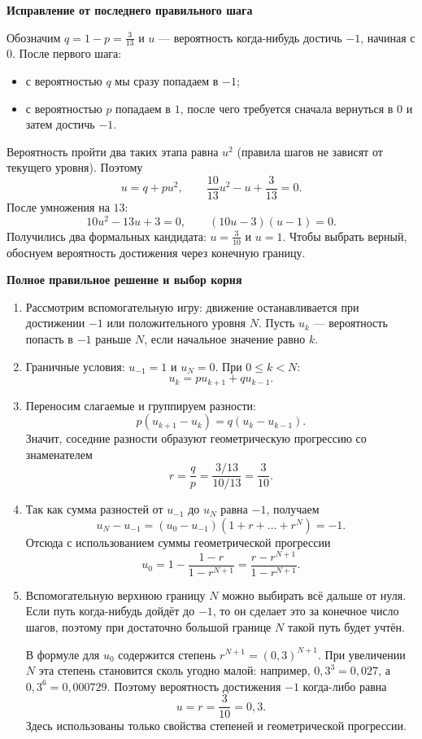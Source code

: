 \documentclass[a4paper,12pt]{article}
\newcommand{\lab}[1]{\par\noindent\textbf{#1}\par\vspace{-4pt}}
\begin{document}
\lab{Исправление от последнего правильного шага}
Обозначим $q=1-p=\frac{3}{13}$ и $u$ --- вероятность когда-нибудь достичь $-1$, начиная с $0$. После первого шага:
\begin{itemize}
\item с вероятностью $q$ мы сразу попадаем в $-1$;
\item с вероятностью $p$ попадаем в $1$, после чего требуется сначала вернуться в $0$ и затем достичь $-1$.
\end{itemize}
Вероятность пройти два таких этапа равна $u^2$ (правила шагов не зависят от текущего уровня). Поэтому
\[
u=q+pu^2,
\qquad \frac{10}{13}u^2-u+\frac{3}{13}=0.
\]
После умножения на $13$:
\[
10u^2-13u+3=0,
\qquad (10u-3)(u-1)=0.
\]
Получились два формальных кандидата: $u=\frac{3}{10}$ и $u=1$. Чтобы выбрать верный, обоснуем вероятность достижения через конечную границу.

\lab{Полное правильное решение и выбор корня}
\begin{enumerate}
\item Рассмотрим вспомогательную игру: движение останавливается при достижении $-1$ или положительного уровня $N$. Пусть $u_k$ --- вероятность попасть в $-1$ раньше $N$, если начальное значение равно $k$.
\item Граничные условия: $u_{-1}=1$ и $u_N=0$. При $0\le k<N$:
\[
u_k=pu_{k+1}+qu_{k-1}.
\]
\item Переносим слагаемые и группируем разности:
\[
p(u_{k+1}-u_k)=q(u_k-u_{k-1}).
\]
Значит, соседние разности образуют геометрическую прогрессию со знаменателем
\[
r=\frac qp=\frac{3/13}{10/13}=\frac3{10}.
\]
\item Так как сумма разностей от $u_{-1}$ до $u_N$ равна $-1$, получаем
\[
u_N-u_{-1}=(u_0-u_{-1})(1+r+\dots+r^N)=-1.
\]
Отсюда с использованием суммы геометрической прогрессии
\[
u_0=1-\frac{1-r}{1-r^{N+1}}=\frac{r-r^{N+1}}{1-r^{N+1}}.
\]
\item Вспомогательную верхнюю границу $N$ можно выбирать всё дальше от нуля. Если путь когда-нибудь дойдёт до $-1$, то он сделает это за конечное число шагов, поэтому при достаточно большой границе $N$ такой путь будет учтён.

В формуле для $u_0$ содержится степень $r^{N+1}=(0{,}3)^{N+1}$. При увеличении $N$ эта степень становится сколь угодно малой: например, $0{,}3^3=0{,}027$, а $0{,}3^6=0{,}000729$. Поэтому вероятность достижения $-1$ когда-либо равна
\[
\boxed{u=r=\frac{3}{10}=0{,}3}.
\]
Здесь использованы только свойства степеней и геометрической прогрессии.
\end{enumerate}
\end{document}
